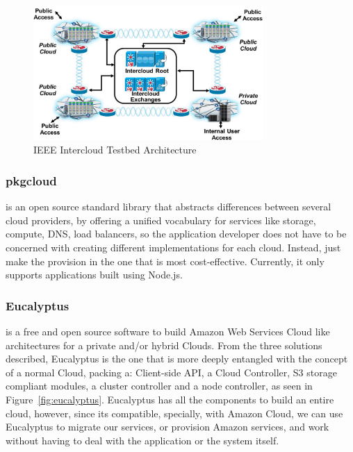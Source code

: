  
\begin{figure}[h!]
  \centering
  \includegraphics[width=0.78\textwidth]{img/testbed-technology.jpg}
  \caption{IEEE Intercloud Testbed Architecture}
  \label{fig:IEEE Intercloud Testbed Architecture}
\end{figure}



\subsubsection{\textbf{pkgcloud}}\label{par:pkgcloud }

is an open source standard library that abstracts differences between several cloud providers, by offering a unified vocabulary for services like storage, compute, DNS, load balancers, so the application developer does not have to be concerned with creating different implementations for each cloud. Instead, just make the provision in the one that is most cost-effective. Currently, it only supports applications built using Node.js.

\subsubsection{\textbf{Eucalyptus}}\label{par:Eucalyptus}

is a free and open source software to build Amazon Web Services Cloud like architectures for a private and/or hybrid Clouds. From the three solutions described, Eucalyptus is the one that is more deeply entangled with the concept of a normal Cloud, packing a: Client-side API, a Cloud Controller, S3 storage compliant modules, a cluster controller and a node controller, as seen in Figure~\ref{fig:eucalyptus}. Eucalyptus has all the components to build an entire cloud, however, since its compatible, specially, with Amazon Cloud, we can use Eucalyptus to migrate our services, or provision Amazon services, and work without having to deal with the application or the system itself.

